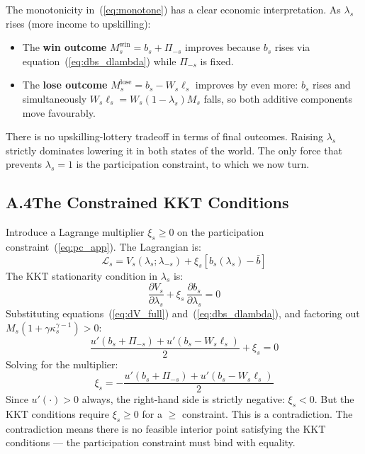 \documentclass[12pt,a4paper]{article}
\begin{document}
The monotonicity in~(\ref{eq:monotone}) has a clear economic
interpretation. As $\lambda_s$ rises (more income to upskilling):
\begin{itemize}
  \item The \textbf{win outcome} $M_s^{\mathrm{win}} = b_s + \Pi_{-s}$
        improves because $b_s$ rises via
        equation~(\ref{eq:dbs_dlambda}) while $\Pi_{-s}$ is fixed.
  \item The \textbf{lose outcome} $M_s^{\mathrm{lose}} = b_s - W_s\ell_s$
        improves by even more: $b_s$ rises and simultaneously
        $W_s\ell_s = W_s(1-\lambda_s)M_s$ falls, so both additive
        components move favourably.
\end{itemize}
There is no upskilling-lottery tradeoff in terms of final outcomes.
Raising $\lambda_s$ strictly dominates lowering it in both states of the
world. The only force that prevents $\lambda_s = 1$ is the participation
constraint, to which we now turn.

\subsection*{A.4\quad The Constrained KKT Conditions}

Introduce a Lagrange multiplier $\xi_s \geq 0$ on the participation
constraint~(\ref{eq:pc_app}). The Lagrangian is:
\begin{equation}
  \mathcal{L}_s
  = V_s(\lambda_s;\lambda_{-s})
  + \xi_s\!\left[b_s(\lambda_s) - \bar{b}\right]
  \tag{A.11}
  \label{eq:lagrangian}
\end{equation}
The KKT stationarity condition in $\lambda_s$ is:
\begin{equation}
  \frac{\partial V_s}{\partial\lambda_s}
  + \xi_s\,\frac{\partial b_s}{\partial\lambda_s} = 0
  \tag{A.12}
  \label{eq:kkt_stat}
\end{equation}
Substituting equations~(\ref{eq:dV_full}) and~(\ref{eq:dbs_dlambda}),
and factoring out $M_s(1+\gamma\kappa_s^{\gamma-1}) > 0$:
\begin{equation}
  \frac{u'(b_s+\Pi_{-s}) + u'(b_s - W_s\ell_s)}{2} + \xi_s = 0
  \tag{A.13}
  \label{eq:kkt_simplified}
\end{equation}
Solving for the multiplier:
\begin{equation}
  \xi_s = -\frac{u'(b_s+\Pi_{-s}) + u'(b_s - W_s\ell_s)}{2}
  \tag{A.14}
  \label{eq:multiplier}
\end{equation}
Since $u'(\cdot) > 0$ always, the right-hand side is strictly negative:
$\xi_s < 0$. But the KKT conditions require $\xi_s \geq 0$ for a
$\geq$ constraint. This is a contradiction. The contradiction means there
is no feasible interior point satisfying the KKT conditions --- the
participation constraint must bind with equality.
\end{document}
